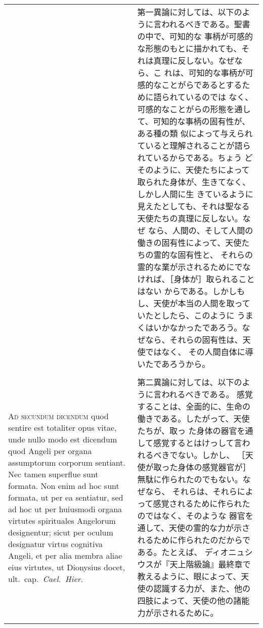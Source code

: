 \documentclass[10pt]{jsarticle} %
\begin{document}
\begin{longtable}{p{21em}p{21em}}
&

第一異論に対しては、以下のように言われるべきである。聖書の中で、可知的な
事柄が可感的な形態のもとに描かれても、それは真理に反しない。なぜなら、こ
れは、可知的な事柄が可感的なことがらであるとするために語られているのでは
なく、可感的なことがらの形態を通して、可知的な事柄の固有性が、ある種の類
似によって与えられていると理解されることが語られているからである。ちょう
どそのように、天使たちによって取られた身体が、生きてなく、しかし人間に生
きているように見えたとしても、それは聖なる天使たちの真理に反しない。なぜ
なら、人間の、そして人間の働きの固有性によって、天使たちの霊的な固有性と、
それらの霊的な業が示されるためにでなければ、［身体が］取られることはない
からである。しかしもし、天使が本当の人間を取っていたとしたら、このように
うまくはいかなかったであろう。なぜなら、それらの固有性は、天使ではなく、
その人間自体に導いたであろうから。


\\\\



{\scshape Ad secundum dicendum} quod sentire est
totaliter opus vitae, unde nullo modo est dicendum quod Angeli per
organa assumptorum corporum sentiant. Nec tamen superflue sunt
formata. Non enim ad hoc sunt formata, ut per ea sentiatur, sed ad hoc
ut per huiusmodi organa virtutes spirituales Angelorum designentur;
sicut per oculum designatur virtus cognitiva Angeli, et per alia membra
aliae eius virtutes, ut Dionysius docet, ult.~cap.~{\itshape Cael.~Hier}.

&

第二異論に対しては、以下のように言われるべきである。
感覚することは、全面的に、生命の働きである。したがって、天使たちが、取っ
 た身体の器官を通して感覚するとはけっして言われるべきでない。しかし、
 ［天使が取った身体の感覚器官が］無駄に作られたのでもない。なぜなら、
 それらは、それらによって感覚されるために作られたのではなく、そのような
 器官を通して、天使の霊的な力が示されるために作られたのだからである。たとえば、
ディオニュシウスが『天上階級論』最終章で教えるように、眼によって、天使の認識する力が、また、他の四肢によって、天使の他の諸能力が示されるために。


\\\\




\end{longtable}
\end{document}
